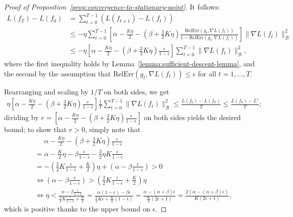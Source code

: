 \documentclass{article}
\newcommand{\B}{\mathcal{B}}
\newcommand{\RelErr}{\mathrm{RelErr}}
\begin{document}
\begin{proof}[Proof of Proposition~\ref{prop:convergence-to-stationary-point}]
    It follows:
    \begin{align*}
        L(f_T) - L(f_0)
        &= \sum_{t=0}^{T-1} \left( L(f_{t+1}) - L(f_t) \right)
        \\ &\leq -\eta \sum_{t=0}^{T-1} \left[ \alpha - \frac{K \eta}{2} - \left( \beta + \frac{3}{2} K \eta \right) \frac{\RelErr(g_t, \nabla L(f_t))}{1-\RelErr(g_t, \nabla L(f_t))} \right] \lVert \nabla L(f_t) \rVert_\B^2
        \\ &\leq -\eta \left[ \alpha - \frac{K \eta}{2} - \left( \beta + \frac{3}{2} K \eta \right) \frac{\epsilon}{1-\epsilon} \right] \sum_{t=0}^{T-1} \lVert \nabla L(f_t) \rVert_\B^2,
    \end{align*}
    where the first inequality holds by Lemma~\ref{lemma:sufficient-descent-lemma}, and the second by the assumption that $\RelErr(g_t, \nabla L(f_t)) \leq \epsilon$ for all $t = 1, \ldots, T$.

    Rearranging and scaling by $1/T$ on both sides, we get
    \begin{align*}
        \eta \left[ \alpha - \frac{K \eta}{2} - \left( \beta + \frac{3}{2} K \eta \right) \frac{\epsilon}{1-\epsilon} \right] \frac{1}{T} \sum_{t=0}^{T-1} \lVert \nabla L(f_t) \rVert_\B^2
        \leq \frac{L(f_0) - L(f_T)}{T}
        \leq \frac{L(f_0) - L^\star}{T};
    \end{align*}
    dividing by $r = \left[ \alpha - \frac{K \eta}{2} - \left( \beta + \frac{3}{2} K \eta \right) \frac{\epsilon}{1-\epsilon} \right]$ on both sides yields the desired bound; to show that $r>0$, simply note that
    \begin{align*}
        &\mathrel{\phantom{=}} \alpha - \frac{K \eta}{2} - \left( \beta + \frac{3}{2} K \eta \right) \frac{\epsilon}{1-\epsilon}
        \\ &= \alpha - \frac{K}{2} \eta - \beta \frac{\epsilon}{1-\epsilon} - \frac{3}{2} \eta K \frac{\epsilon}{1-\epsilon}
        \\ &= -\left( \frac{3}{2} K \frac{\epsilon}{1-\epsilon} + \frac{K}{2} \right) \eta + \left( \alpha - \beta \frac{\epsilon}{1-\epsilon} \right) > 0
        \\ &\iff \left( \alpha - \beta \frac{\epsilon}{1-\epsilon} \right) > \left( \frac{3}{2} K \frac{\epsilon}{1-\epsilon} + \frac{K}{2} \right) \eta
        \\ &\iff \eta < \frac{\alpha - \beta \frac{\epsilon}{1-\epsilon}}{\frac{3}{2} K \frac{\epsilon}{1-\epsilon} + \frac{K}{2}}
                      = \frac{\alpha (1-\epsilon) - \beta \epsilon}{\frac{3}{2} K \epsilon + \frac{K}{2} (1-\epsilon)}
                      = \frac{\alpha - (\alpha + \beta) \epsilon}{ \frac{K}{2} \left( 2\epsilon + 1 \right) }
                      = \frac{2 (\alpha - (\alpha + \beta) \epsilon)}{ K \left( 2\epsilon + 1 \right) },
    \end{align*}
    which is positive thanks to the upper bound on $\epsilon$.
\end{proof}
\end{document}

